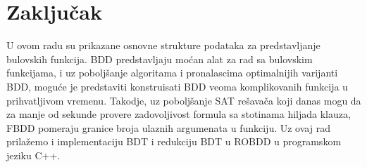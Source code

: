 \section{Zaklju\v{c}ak}
\label{sec:Zakljucak}

U ovom radu su prikazane osnovne strukture podataka za predstavljanje bulovskih funkcija. BDD predstavljaju mo\'c{}an alat za rad sa bulovskim funkcijama, i uz pobolj\v{s}anje algoritama i pronalascima optimalnijih varijanti BDD, mogu\'c{}e je predstaviti konstruisati BDD veoma komplikovanih funkcija u prihvatljivom vremenu. Takodje, uz pobolj\v{s}anje SAT re\v{s}ava\v{c}a koji danas mogu da za manje od sekunde provere zadovoljivost formula sa stotinama hiljada klauza, FBDD pomeraju granice broja ulaznih argumenata u funkciju. Uz ovaj rad prila\v{z}emo i implementaciju BDT i redukciju BDT u ROBDD u programskom jeziku C++.
